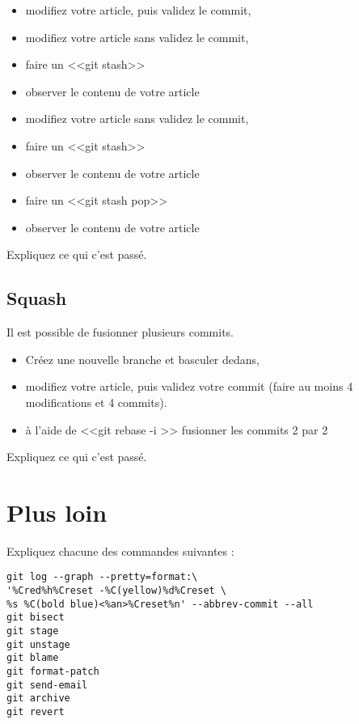 \documentclass[a4paper]{article}
\begin{document}
\begin{itemize}
  \item modifiez votre article, puis validez le commit,
  \item modifiez votre article sans validez le commit,
  \item faire un <<git stash>>
  \item observer le contenu de votre article
  \item modifiez votre article sans validez le commit,
  \item faire un <<git stash>>
  \item observer le contenu de votre article
  \item faire un <<git stash pop>> 
  \item observer le contenu de votre article
\end{itemize}

Expliquez ce qui c'est passé.

\subsection{Squash}

Il est possible de fusionner plusieurs commits.

\begin{itemize}
  \item Créez une nouvelle branche et basculer dedans,
  \item modifiez votre article, puis validez votre commit (faire au moins 4 modifications et 4 commits). 
  \item à l'aide de <<git rebase -i >> fusionner les commits 2 par 2
\end{itemize}

Expliquez ce qui c'est passé.

\section{Plus loin}

Expliquez chacune des commandes suivantes :
\begin{verbatim}
git log --graph --pretty=format:\
'%Cred%h%Creset -%C(yellow)%d%Creset \
%s %C(bold blue)<%an>%Creset%n' --abbrev-commit --all
git bisect
git stage
git unstage
git blame 
git format-patch
git send-email
git archive
git revert
\end{verbatim}
\end{document}
